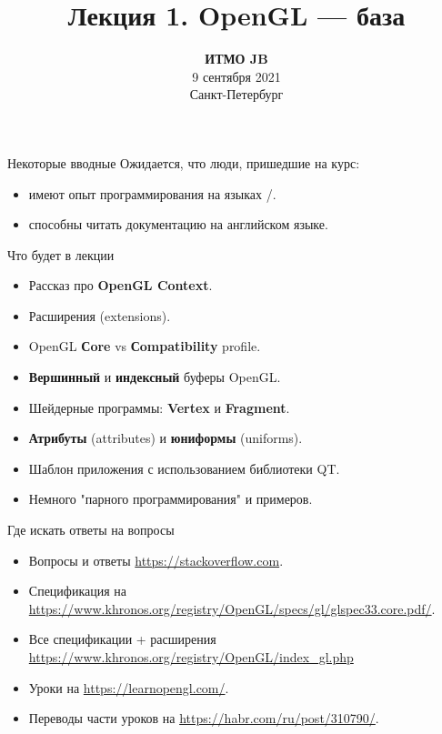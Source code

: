 \documentclass[aspectration=1610,t]{beamer}
\title{Лекция 1. OpenGL --- база}
\date{
   \textbf{ИТМО JB}\\
   9 сентября 2021\\
   Санкт-Петербург
}
\begin{document}
\begin{frame}
  \titlepage
\end{frame}

\begin{frame}[fragile]{Некоторые вводные}
    Ожидается, что люди, пришедшие на курс:
    \begin{itemize}
        \item имеют опыт программирования на языках \langc/\langcpp.
        \item способны читать документацию на английском языке.
    \end{itemize}
\end{frame}

\begin{frame}[fragile]{Что будет в лекции}
    \begin{itemize}
        \item Рассказ про {\bf OpenGL Context}.
        \item Расширения (extensions).
        \item OpenGL {\bf Сore} vs {\bf Сompatibility} profile.
        \item {\bf Вершинный} и {\bf индексный} буферы OpenGL.
        \item Шейдерные программы: {\bf Vertex} и {\bf Fragment}.
        \item {\bf Атрибуты} (attributes) и {\bf юниформы} (uniforms).
        \item Шаблон приложения с использованием библиотеки QT.
        \item Немного "парного программирования" и примеров.
    \end{itemize}
\end{frame}

\begin{frame}[fragile]{Где искать ответы на вопросы}
    \begin{itemize}
        \item Вопросы и ответы \url{https://stackoverflow.com}.
        \item Спецификация на \url{https://www.khronos.org/registry/OpenGL/specs/gl/glspec33.core.pdf/}.
        \item Все спецификации + расширения \url{https://www.khronos.org/registry/OpenGL/index_gl.php}
        \item Уроки на \url{https://learnopengl.com/}.
        \item Переводы части уроков на \url{https://habr.com/ru/post/310790/}.
    \end{itemize}
\end{frame}
\end{document}
